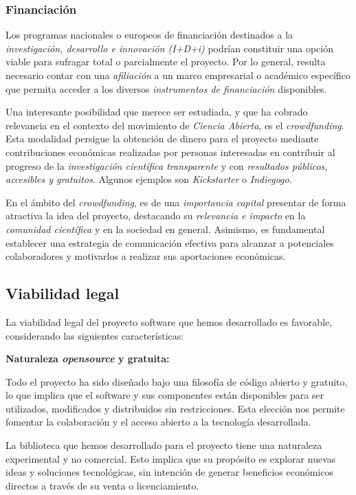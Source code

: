 \subsubsection{Financiación}

Los programas nacionales o europeos de financiación destinados a la \textit{investigación, desarrollo e innovación (I+D+i)} 
podrían constituir una opción viable para sufragar total o parcialmente el proyecto. Por lo general, resulta necesario contar 
con una \textit{afiliación} a un marco empresarial o académico específico que permita acceder a los 
diversos \textit{instrumentos de financiación} disponibles.

Una interesante posibilidad que merece ser estudiada, y que ha cobrado relevancia en el contexto del movimiento 
de \textit{Ciencia Abierta}, es el \textit{crowdfunding}. Esta modalidad persigue la obtención de dinero  
para el proyecto mediante contribuciones económicas realizadas por personas interesadas en contribuir al progreso 
de la \textit{investigación científica transparente} y con \textit{resultados públicos, accesibles y gratuitos}. Algunos ejemplos son
\textit{Kickstarter}\cite{kickstarter} o \textit{Indiegogo}\cite{indiegogo}.

En el ámbito del \textit{crowdfunding}, es de una \textit{importancia capital} presentar de forma atractiva 
la idea del proyecto, destacando su \textit{relevancia e impacto} en la \textit{comunidad científica} y en 
la sociedad en general. Asimismo, es fundamental establecer una estrategia de comunicación efectiva 
para alcanzar a potenciales colaboradores y motivarlos a realizar sus aportaciones económicas.


\subsection{Viabilidad legal}

La viabilidad legal del proyecto software que hemos desarrollado es favorable, considerando las siguientes características:

\textbf{Naturaleza \textit{opensource} y gratuita:} 

Todo el proyecto ha sido diseñado bajo una filosofía de código abierto y gratuito, 
lo que implica que el software y sus componentes están disponibles para ser utilizados, modificados y distribuidos sin 
restricciones. Esta elección nos permite fomentar la colaboración y el acceso abierto a la tecnología desarrollada.

La biblioteca que hemos desarrollado para el proyecto tiene 
una naturaleza experimental y no comercial. Esto implica que su propósito es explorar nuevas ideas y soluciones tecnológicas, 
sin intención de generar beneficios económicos directos a través de su venta o licenciamiento.

